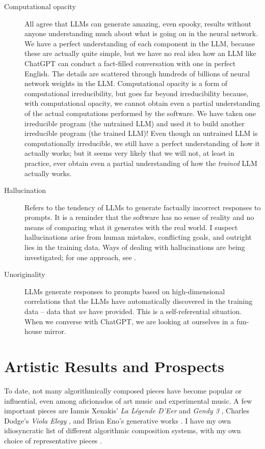 \documentclass[11pt,papersize=a4]{scrartcl}
\begin{document}
\begin{description}
\item[Computational opacity] All agree that LLMs can generate amazing, even spooky, results without anyone understanding much about what is going on in the neural network. We have a perfect understanding of each component in the LLM, because these are actually quite simple, but we have no real idea how an LLM like ChatGPT can conduct a fact-filled conversation with one in perfect English. The details are scattered through hundreds of billions of neural network weights in the LLM. Computational opacity is a form of computational irreducibility, but goes far beyond irreducibility because, with computational opacity, we cannot obtain even a partial understanding of the actual computations performed by the software. We have taken one irreducible program (the untrained LLM) and used it to build another irreducible program (the trained LLM)! Even though an untrained LLM is computationally irreducible, we still have a perfect understanding of how it actually works; but it seems very likely that we will not, at least in practice, ever obtain even a partial understanding of how the \emph{trained} LLM actually works.
\item [Hallucination] Refers to the tendency of LLMs to generate factually incorrect responses to prompts. It is a reminder that the software has no sense of reality and no means of comparing what it generates with the real world. I suspect hallucinations arise from human mistakes, conflicting goals, and outright lies in the training data. Ways of dealing with hallucinations are being investigated; for one approach, see \parencite{christiano2017deep}.
\item [Unoriginality] LLMs generate responses to prompts based on high-dimensional correlations that the LLMs have automatically discovered in the training data -- data that \emph{we} have provided. This is a self-referential situation. When we converse with ChatGPT, we are looking at ourselves in a fun-house mirror.
\end{description}

\section*{Artistic Results and Prospects}

To date, not many algorithmically composed pieces have become popular or influential, even among aficionados of art music and experimental music. A few important pieces are Iannis Xenakis' \emph{La Légende D'Eer} \parencite{Solr-8143160} and \emph{Gendy 3} \parencite{gendy3},  Charles Dodge's \emph{Viola Elegy} \parencite{violaelegy}, and Brian Eno's generative works \parencite{eno1996generative, enochilvers}. I have my own idiosyncratic list of different algorithmic composition systems, with my own choice of representative pieces \parencite{rant}.
\end{document}
